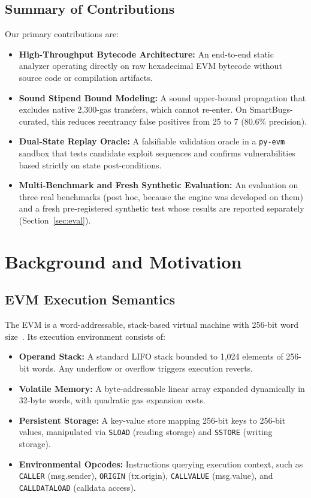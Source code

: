 \documentclass[conference]{IEEEtran}
\begin{document}
\subsection{Summary of Contributions}
Our primary contributions are:
\begin{itemize}
    \item \textbf{High-Throughput Bytecode Architecture:} An end-to-end static analyzer operating directly on raw hexadecimal EVM bytecode without source code or compilation artifacts.
    \item \textbf{Sound Stipend Bound Modeling:} A sound upper-bound propagation that excludes native 2,300-gas transfers, which cannot re-enter. On SmartBugs-curated, this reduces reentrancy false positives from 25 to 7 (80.6\% precision).
    \item \textbf{Dual-State Replay Oracle:} A falsifiable validation oracle in a \texttt{py-evm} sandbox that tests candidate exploit sequences and confirms vulnerabilities based strictly on state post-conditions.
    \item \textbf{Multi-Benchmark and Fresh Synthetic Evaluation:} An evaluation on three real benchmarks (post hoc, because the engine was developed on them) and a fresh pre-registered synthetic test whose results are reported separately (Section~\ref{sec:eval}).
\end{itemize}

\section{Background and Motivation}\label{sec:background}

\subsection{EVM Execution Semantics}
The EVM is a word-addressable, stack-based virtual machine with 256-bit word size~\cite{wood2014ethereum, grishchenko2018semantic}. Its execution environment consists of:
\begin{itemize}
    \item \textbf{Operand Stack:} A standard LIFO stack bounded to 1,024 elements of 256-bit words. Any underflow or overflow triggers execution reverts.
    \item \textbf{Volatile Memory:} A byte-addressable linear array expanded dynamically in 32-byte words, with quadratic gas expansion costs.
    \item \textbf{Persistent Storage:} A key-value store mapping 256-bit keys to 256-bit values, manipulated via \texttt{SLOAD} (reading storage) and \texttt{SSTORE} (writing storage).
    \item \textbf{Environmental Opcodes:} Instructions querying execution context, such as \texttt{CALLER} (msg.sender), \texttt{ORIGIN} (tx.origin), \texttt{CALLVALUE} (msg.value), and \texttt{CALLDATALOAD} (calldata access).
\end{itemize}
\end{document}
